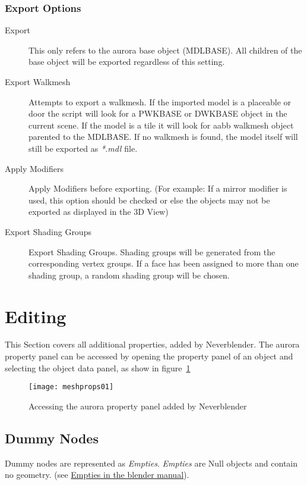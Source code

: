 \documentclass[a4paper]{article}
\begin{document}
\subsubsection*{Export Options}
\begin{description}
    \item[Export] This only refers to the aurora base object (MDLBASE). All children of the base object will be exported regardless of this setting.
    \item[Export Walkmesh] Attempts to export a walkmesh. If the imported model is a placeable or door the script will look for a PWKBASE or DWKBASE object in the current scene. If the model is a tile it will look for aabb walkmesh object parented to the MDLBASE. If no walkmesh is found, the model itself will still be exported as {\itshape{*.mdl }} file.
    \item[Apply Modifiers] Apply Modifiers before exporting. (For example: If a mirror modifier is used, this option should be checked or else the objects may not be exported as displayed in the 
3D View)
    \item[Export Shading Groups] Export Shading Groups. Shading groups will be generated from the corresponding vertex groups. If a face has been assigned to more than one shading group, a random  shading group will be chosen. 
\end{description}

\section{Editing}
This Section covers all additional properties, added by Neverblender. The aurora property panel can be accessed by opening the property panel of an object and selecting the object data panel, as show in figure~\ref{fig:meshprops01}

\begin{figure}
  \centering
  \texttt{[image: meshprops01]}
  \caption[mdl import]{Accessing the aurora property panel added by Neverblender}
  \label{fig:meshprops01}
\end{figure}

\subsection{Dummy Nodes}
Dummy nodes are represented as {\itshape{Empties}}. {\itshape{Empties}} are Null objects and contain no geometry. (see  \hyperref{http://wiki.blender.org/index.php/Doc:2.6/Manual/Modeling/Empties}{}{}{Empties in the blender manual}).
\end{document}
